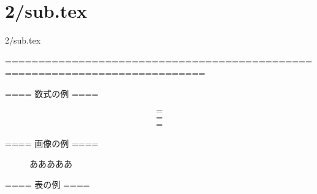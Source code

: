 \documentclass[12pt,a4j]{jarticle}
\begin{document}
\fi
\section{2/sub.tex}
2/sub.tex





============================================================================

==== 数式の例 ====

\begin{eqnarray}
	&	=	&	\\
	&	=	&	\nonumber \\
	&	=	&	
\end{eqnarray}


==== 画像の例 ====

\begin{figure}[H]
	\centering
	\caption{あああああ}
	\label{aaaaaa}
\end{figure}


==== 表の例 ====
\end{document}
